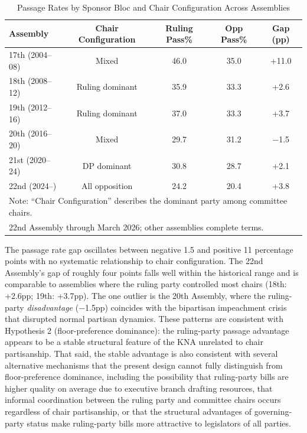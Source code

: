 \documentclass[11pt]{article}
\begin{document}
\begin{table}[H]
\centering
\caption{Passage Rates by Sponsor Bloc and Chair Configuration Across Assemblies}
\label{tab:crossassembly}
\begin{tabular}{lcccc}
\toprule
Assembly & Chair Configuration & Ruling Pass\% & Opp Pass\% & Gap (pp) \\
\midrule
17th (2004--08) & Mixed & 46.0 & 35.0 & +11.0 \\
18th (2008--12) & Ruling dominant & 35.9 & 33.3 & +2.6 \\
19th (2012--16) & Ruling dominant & 37.0 & 33.3 & +3.7 \\
20th (2016--20) & Mixed & 29.7 & 31.2 & $-$1.5 \\
21st (2020--24) & DP dominant & 30.8 & 28.7 & +2.1 \\
22nd (2024--) & All opposition & 24.2 & 20.4 & +3.8 \\
\bottomrule
\multicolumn{5}{l}{\footnotesize Note: ``Chair Configuration'' describes the dominant party among committee chairs.} \\
\multicolumn{5}{l}{\footnotesize 22nd Assembly through March 2026; other assemblies complete terms.} \\
\end{tabular}
\end{table}

The passage rate gap oscillates between negative 1.5 and positive 11 percentage points with no systematic relationship to chair configuration. The 22nd Assembly's gap of roughly four points falls well within the historical range and is comparable to assemblies where the ruling party controlled most chairs (18th: +2.6pp; 19th: +3.7pp). The one outlier is the 20th Assembly, where the ruling-party \textit{disadvantage} ($-$1.5pp) coincides with the bipartisan impeachment crisis that disrupted normal partisan dynamics. These patterns are consistent with Hypothesis 2 (floor-preference dominance): the ruling-party passage advantage appears to be a stable structural feature of the KNA unrelated to chair partisanship. That said, the stable advantage is also consistent with several alternative mechanisms that the present design cannot fully distinguish from floor-preference dominance, including the possibility that ruling-party bills are higher quality on average due to executive branch drafting resources, that informal coordination between the ruling party and committee chairs occurs regardless of chair partisanship, or that the structural advantages of governing-party status make ruling-party bills more attractive to legislators of all parties.
\end{document}
